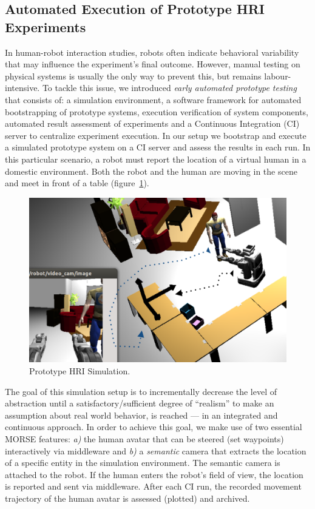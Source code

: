\documentclass[conference]{IEEEtran}
\begin{document}
\subsection{Automated Execution of Prototype HRI Experiments}
\label{sc:ci}

In human-robot interaction studies, robots often indicate behavioral variability
that may influence the experiment's final outcome.  However, manual testing on
physical systems is usually the only way to prevent this, but remains
labour-intensive. To tackle this issue, we introduced \emph{early automated
prototype testing}~\cite{2645922} that consists of: a simulation environment, a
software framework for automated bootstrapping of prototype systems, execution
verification of system components, automated result assessment of experiments
and a Continuous Integration (CI) server to centralize experiment execution. In
our setup we bootstrap and execute a simulated prototype system on a CI server
and assess the results in each run. In this particular scenario, a robot must
report the location of a virtual human in a domestic environment. Both the
robot and the human are moving in the scene and meet in front of a table
(figure~\ref{fig|proto}).

\begin{figure}[H]
      \centering
      \includegraphics[width=0.9\linewidth]{proto-setup.png}
      \caption{Prototype HRI Simulation.}
      \label{fig|proto}
\end{figure}

The goal of this simulation setup is to incrementally decrease the level of
abstraction until a satisfactory/sufficient degree of ``realism'' to make an
assumption about real world behavior, is reached --- in an integrated and
continuous approach. In order to achieve this goal, we make use of two essential
MORSE features: \textit{a)} the human avatar that can be steered (set waypoints)
interactively via middleware and \textit{b)} a \emph{semantic} camera
that extracts the location of a specific entity in the simulation environment.
The semantic camera is attached to the robot. If the human enters the robot's
field of view, the location is reported and sent via middleware. After each CI
run, the recorded movement trajectory of the human avatar is assessed (plotted)
and archived. 
\end{document}
